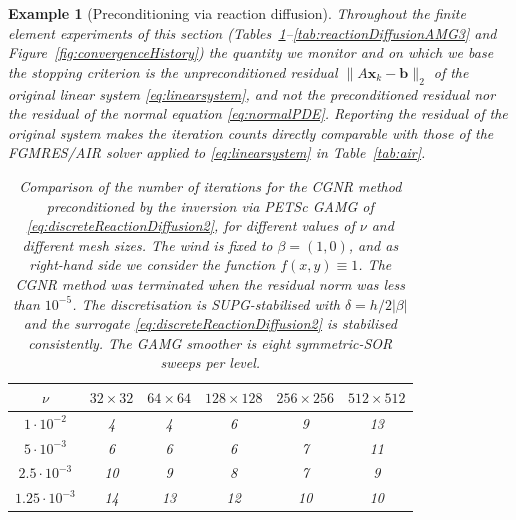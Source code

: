 \documentclass[hidelinks,onefignum,onetabnum]{siamart220329}
\newcommand{\bb}[1]{#1}
\newtheorem{example}{Example}
\let\vec\mathbf
\begin{document}
\begin{example}[Preconditioning via reaction diffusion]
    \bb{Throughout the finite element experiments of this section (Tables~\ref{tab:reactionDiffusionAMG}--\ref{tab:reactionDiffusionAMG3} and Figure~\ref{fig:convergenceHistory}) the quantity we monitor and on which we base the stopping criterion is the \emph{unpreconditioned} residual $\lVert A\vec{x}_k - \vec{b}\rVert_2$ of the original linear system \eqref{eq:linearsystem}, and not the preconditioned residual nor the residual of the normal equation \eqref{eq:normalPDE}. Reporting the residual of the original system makes the iteration counts directly comparable with those of the FGMRES/AIR solver applied to \eqref{eq:linearsystem} in Table~\ref{tab:air}.}
    \begin{table}
        \centering
        \caption{Comparison of the number of iterations for the CGNR method preconditioned by the inversion via PETSc GAMG of \eqref{eq:discreteReactionDiffusion2}, for different values of $\nu$ and different mesh sizes.
            The wind is fixed to $\beta = (1,0)$, and as right-hand side we consider the function $f(x,y) \equiv 1$.
            The CGNR method was terminated when the \bb{residual norm}  was less than $10^{-5}$. \bb{The discretisation is SUPG-stabilised with $\delta = h/2|\beta|$ and the surrogate \eqref{eq:discreteReactionDiffusion2} is stabilised consistently. The GAMG smoother is eight symmetric-SOR sweeps per level.}}
        \label{tab:reactionDiffusionAMG}
        \begin{tabular}{c|c|c|c|c|c}
            \toprule
            $\nu$               & $32\times 32$ & $64\times 64$ & $128\times 128$ & $256\times 256$ & $512\times 512$ \\
            \midrule
            $1\cdot 10^{-2}$    &  4 &  4 &  6 &  9 & 13 \\
            $5\cdot 10^{-3}$    &  6 &  6 &  6 &  7 & 11 \\
            $2.5\cdot 10^{-3}$  & 10 &  9 &  8 &  7 &  9 \\
            $1.25\cdot 10^{-3}$ & 14 & 13 & 12 & 10 & 10 \\
            \bottomrule
        \end{tabular}
        \vspace{1cm}

\end{table}
\end{example}
\end{document}
